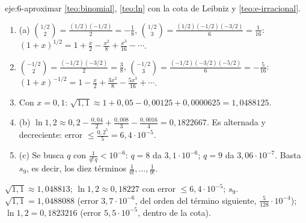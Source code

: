 \begin{solucion}{eje:6-aproximar}
\planteamiento \cref{teo:binomial}, \cref{teo:ln} con la cota de Leibniz y \cref{teo:e-irracional}.
\pasos
\begin{enumerate}[label=\arabic*.]
  \item (a) $\binom{1/2}{2}=\frac{(1/2)(-1/2)}{2}=-\frac18$, $\binom{1/2}{3}=\frac{(1/2)(-1/2)(-3/2)}{6}=\frac{1}{16}$: $(1+x)^{1/2}=1+\frac x2-\frac{x^{2}}{8}+\frac{x^{3}}{16}-\cdots$.
  \item $\binom{-1/2}{2}=\frac{(-1/2)(-3/2)}{2}=\frac38$, $\binom{-1/2}{3}=\frac{(-1/2)(-3/2)(-5/2)}{6}=-\frac{5}{16}$: $(1+x)^{-1/2}=1-\frac x2+\frac{3x^{2}}{8}-\frac{5x^{3}}{16}+\cdots$.
  \item Con $x=0{,}1$: $\sqrt{1{,}1}\approx1+0{,}05-0{,}00125+0{,}0000625=1{,}0488125$.
  \item (b) $\ln1{,}2\approx0{,}2-\frac{0{,}04}{2}+\frac{0{,}008}{3}-\frac{0{,}0016}{4}=0{,}1822667$. Es alternada y decreciente: error $\le\frac{0{,}2^{5}}{5}=6{,}4\cdot10^{-5}$.
  \item (c) Se busca $q$ con $\frac{1}{q!\,q}<10^{-6}$: $q=8$ da $3{,}1\cdot10^{-6}$; $q=9$ da $3{,}06\cdot10^{-7}$. Basta $s_9$, es decir, los diez términos $\frac{1}{0!},\dots,\frac{1}{9!}$.
\end{enumerate}
\resultado $\sqrt{1{,}1}\approx1{,}048813$; $\ln1{,}2\approx0{,}18227$ con error $\le6{,}4\cdot10^{-5}$; $s_9$.
\comprobacion $\sqrt{1{,}1}=1{,}0488088$ (error $3{,}7\cdot10^{-6}$, del orden del término siguiente, $\frac{5}{128}\cdot10^{-4}$); $\ln1{,}2=0{,}1823216$ (error $5{,}5\cdot10^{-5}$, dentro de la cota).
\end{solucion}


